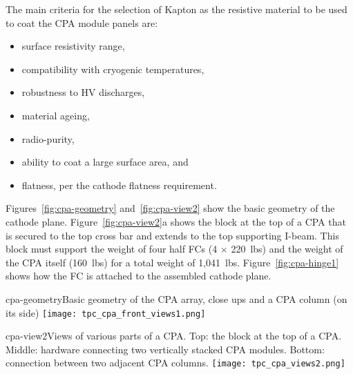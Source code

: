 
The main criteria for the selection of Kapton as the resistive material to be used to coat the CPA module panels are: %
\begin{itemize}
\item surface resistivity range,
\item compatibility with cryogenic temperatures,
\item robustness to HV discharges, 
\item material ageing,
\item radio-purity,
\item ability to coat a large surface area, and %
\item flatness, per the cathode flatness requirement. 
\end{itemize}


Figures~\ref{fig:cpa-geometry} and~\ref{fig:cpa-view2} show the basic geometry of the cathode plane. Figure~\ref{fig:cpa-view2}a shows the block at the top of a CPA that is secured to the top cross bar and extends to the top supporting I-beam.  This block must support the weight of four half FCs (4 $\times$ 220~lbs) and the weight of the CPA itself (160~lbs) for a total weight of 1,041~lbs.  Figure~\ref{fig:cpa-hinge1} shows how the FC is attached to the assembled cathode plane. 

\begin{cdrfigure}{cpa-geometry}{Basic geometry of the CPA array, close ups and a CPA column (on its side)} 
\texttt{[image: tpc\_cpa\_front\_views1.png]}
\end{cdrfigure}

\begin{cdrfigure}{cpa-view2}{Views of various parts of a CPA. Top: the block at the top of a CPA. Middle: hardware connecting two vertically stacked CPA modules. Bottom: connection between two adjacent CPA columns.} 
\texttt{[image: tpc\_cpa\_views2.png]}
\end{cdrfigure}

